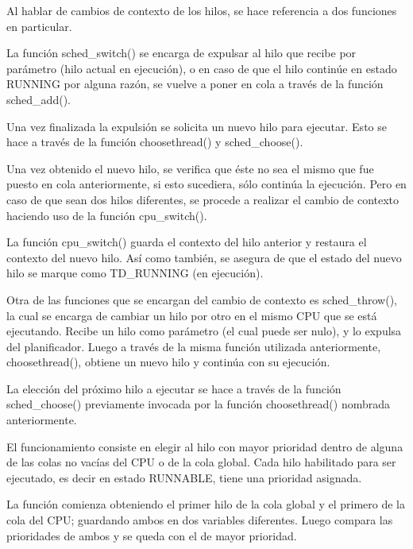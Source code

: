 Al hablar de cambios de contexto de los hilos, se hace referencia a dos funciones en particular.\par

La función sched\_switch() se encarga de expulsar al hilo que recibe por parámetro (hilo actual en ejecución), o en caso de que el hilo continúe en estado RUNNING por alguna razón, se vuelve a poner en cola a través de la función sched\_add().\par

Una vez finalizada la expulsión se solicita un nuevo hilo para ejecutar. Esto se hace a través de la función choosethread() y sched\_choose().\par

Una vez obtenido el nuevo hilo, se verifica que éste no sea el mismo que fue puesto en cola anteriormente, si esto sucediera, sólo continúa la ejecución. Pero en caso de que sean dos hilos diferentes, se procede a realizar el cambio de contexto haciendo uso de la función cpu\_switch().\par

La función cpu\_switch() guarda el contexto del hilo anterior y restaura el contexto del nuevo hilo. Así como también, se asegura de que el estado del nuevo hilo se marque como TD\_RUNNING (en ejecución).\par

Otra de las funciones que se encargan del cambio de contexto es sched\_throw(), la cual se encarga de cambiar un hilo por otro en el mismo CPU que se está ejecutando. Recibe un hilo como parámetro (el cual puede ser nulo), y lo expulsa del planificador. Luego a través de la misma función utilizada anteriormente, choosethread(), obtiene un nuevo hilo y continúa con su ejecución.\par

La elección del próximo hilo a ejecutar se hace a través de la función sched\_choose() previamente invocada por la función choosethread() nombrada anteriormente.

El funcionamiento consiste en elegir al hilo con mayor prioridad dentro de alguna de las colas no vacías del CPU o de la cola global. Cada hilo habilitado para ser ejecutado, es decir en estado RUNNABLE, tiene una prioridad asignada.

La función comienza obteniendo el primer hilo de la cola global y el primero de la cola del CPU; guardando ambos en dos variables diferentes. Luego compara las prioridades de ambos y se queda con el de mayor prioridad.

